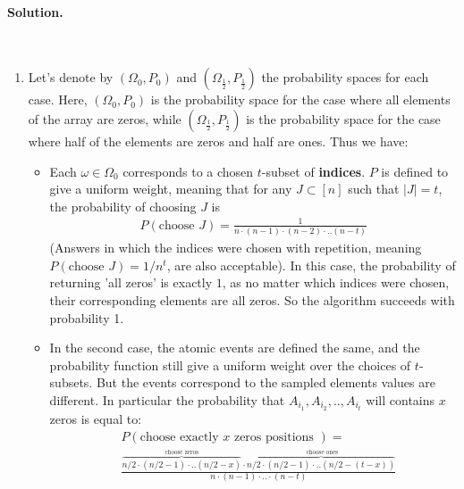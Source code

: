 \ifdefined\SOLUTION
  \paragraph{Solution.} \\ 
  \begin{enumerate}
    \item Let's denote by $(\Omega_0, P_0)$ and $(\Omega_{\frac{1}{2}}, P_{\frac{1}{2}})$ the probability spaces for each case. Here, $(\Omega_0, P_0)$ is the probability space for the case where all elements of the array are zeros, while $(\Omega_{\frac{1}{2}}, P_{\frac{1}{2}})$ is the probability space for the case where half of the elements are zeros and half are ones. Thus we have:
      \begin{itemize}
        \item Each $\omega \in \Omega_{0}$ corresponds to a chosen $t$-subset of \textbf{indices}. $P$ is defined to give a uniform weight, meaning that for any $J \subset [n]$ such that $|J| = t$, the probability of choosing $J$ is 
          \begin{equation*}
            \begin{split}
              P(\text{choose } J) = \frac{1}{n \cdot (n -1 ) \cdot (n-2) \cdot .. (n-t)}
            \end{split}
          \end{equation*}
          (Answers in which the indices were chosen with repetition, meaning $P(\text{choose } J) = 1/n^{t}$, are also acceptable). In this case, the probability of returning 'all zeros' is exactly $1$, as no matter which indices were chosen, their corresponding elements are all zeros. So the algorithm succeeds with probability 1.  
        \item In the second case, the atomic events are defined the same, and the probability function still give a uniform weight over the choices of $t$-subsets. But the events correspond to the sampled elements values are different. In particular the probability that $A_{i_1},A_{i_2},..,A_{i_t}$ will contains $x$ zeros is equal to:
          \begin{equation*}
            \begin{split}
            & P(\text{choose exactly } x \text{ zeros positions }  ) = \\
              & \frac{ \overbrace{n/2 \cdot (n/2 -1 ) \cdot .. (n/2-x)}^{\text{ choose zeros }} \cdot \overbrace{ n/2 \cdot (n/2 -1 ) \cdot .. (n/2-(t-x))}^{\text{ choose ones}}}{ n \cdot (n-1) \cdot .. \cdot (n-t)}

\end{split}
\end{equation*}
\end{itemize}
\end{enumerate}

